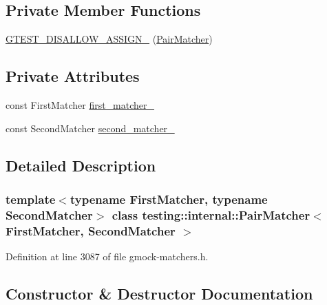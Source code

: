 \subsection*{Private Member Functions}
\begin{DoxyCompactItemize}
\item 
\hyperlink{classtesting_1_1internal_1_1PairMatcher_aa1e46fafd6d017cfff8884906e567d92}{G\+T\+E\+S\+T\+\_\+\+D\+I\+S\+A\+L\+L\+O\+W\+\_\+\+A\+S\+S\+I\+G\+N\+\_\+} (\hyperlink{classtesting_1_1internal_1_1PairMatcher}{Pair\+Matcher})
\end{DoxyCompactItemize}
\subsection*{Private Attributes}
\begin{DoxyCompactItemize}
\item 
const First\+Matcher \hyperlink{classtesting_1_1internal_1_1PairMatcher_ac3e59612dd93bddb7ce606ab4419bc26}{first\+\_\+matcher\+\_\+}
\item 
const Second\+Matcher \hyperlink{classtesting_1_1internal_1_1PairMatcher_a2ff03fa2ac3d715052feb21b7b61084d}{second\+\_\+matcher\+\_\+}
\end{DoxyCompactItemize}


\subsection{Detailed Description}
\subsubsection*{template$<$typename First\+Matcher, typename Second\+Matcher$>$\newline
class testing\+::internal\+::\+Pair\+Matcher$<$ First\+Matcher, Second\+Matcher $>$}



Definition at line 3087 of file gmock-\/matchers.\+h.



\subsection{Constructor \& Destructor Documentation}
\mbox{\label{classtesting_1_1internal_1_1PairMatcher_a84f233a7d90ba33e3f0eb7410783c43c}} 
